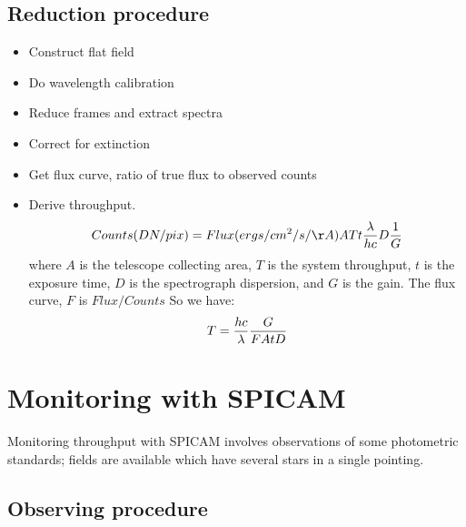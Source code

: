 \documentclass{article}
\begin{document}
\subsection{Reduction procedure}
\begin{itemize}
\item Construct flat field
\item Do wavelength calibration
\item Reduce frames and extract spectra 
\item Correct for extinction
\item Get flux curve, ratio of true flux to observed counts
\item Derive throughput. 
$$Counts(DN/pix) = Flux (ergs/cm^2/s/\AA) A T t {\lambda\over hc} D {1\over G}$$
where $A$ is the telescope collecting area, $T$ is the system throughput,
$t$ is the exposure time, $D$ is the spectrograph dispersion, and $G$ is
the gain. The flux curve, $F$ is $Flux/Counts$ So we have:
$$T = {hc \over \lambda} {G\over F A t D}$$

\end{itemize}

\section{Monitoring with SPICAM}

Monitoring throughput with SPICAM involves observations of some photometric
standards; fields are available which have several stars in a single
pointing.

\subsection{Observing procedure}
\end{document}
